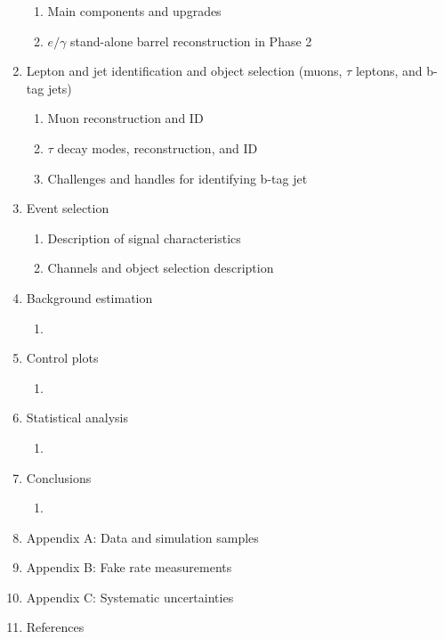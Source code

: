 \documentclass{article}
\begin{document}
\begin{enumerate}
\begin{enumerate}
            \item Main components and upgrades
            \item $e/\gamma$ stand-alone barrel reconstruction in Phase 2
        \end{enumerate}
    \item Lepton and jet identification and object selection (muons, $\tau$ leptons, and b-tag jets)
        \begin{enumerate}
            \item Muon reconstruction and ID 
            \item $\tau$ decay modes, reconstruction, and ID
            \item Challenges and handles for identifying b-tag jet
        \end{enumerate}
    \item Event selection 
        \begin{enumerate}
            \item Description of signal characteristics 
            \item Channels and object selection description
        \end{enumerate}
    \item Background estimation 
        \begin{enumerate}
            \item 
        \end{enumerate}
    \item Control plots
        \begin{enumerate}
        \item 
        \end{enumerate}
    \item Statistical analysis
        \begin{enumerate}
            \item 
        \end{enumerate}
    \item Conclusions
        \begin{enumerate}
            \item
        \end{enumerate}
    \item Appendix A: Data and simulation samples
    \item Appendix B: Fake rate measurements
    \item Appendix C: Systematic uncertainties
    \item References
\end{enumerate}
\end{document}
